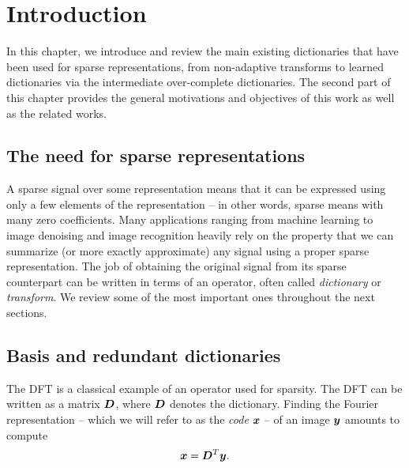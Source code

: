 \tableofcontents



\chapter{Introduction} %

In this chapter, we introduce and review the main existing dictionaries that have been used for sparse representations, from non-adaptive transforms to learned dictionaries via the intermediate over-complete dictionaries. The second part of this chapter provides the general motivations and objectives of this work as well as the related works.

\section{The need for sparse representations}

A sparse signal over some representation means that it can be expressed using only a few elements of the representation – in other words, sparse means with many zero coefficients. Many applications ranging from machine learning to image denoising and image recognition heavily rely on the property that we can summarize (or more exactly approximate) any signal using a proper sparse representation. The job of obtaining the original signal from its sparse counterpart can be written in terms of an operator, often called \emph{dictionary} or \emph{transform}. We review some of the most important ones throughout the next sections.

\section{Basis and redundant dictionaries}

The \ac{DFT} is a classical example of an operator used for sparsity. The \ac{DFT} can be written as a matrix $\bm{D}$, where $\bm{D}$ denotes the dictionary. Finding the Fourier representation – which we will refer to as the \emph{code} $\bm{x}$ – of an image $\bm{y}$ amounts to compute 
\begin{equation}\bm{x} = \bm{D}^T\bm{y}.\label{eq_matrixvector}\end{equation}

